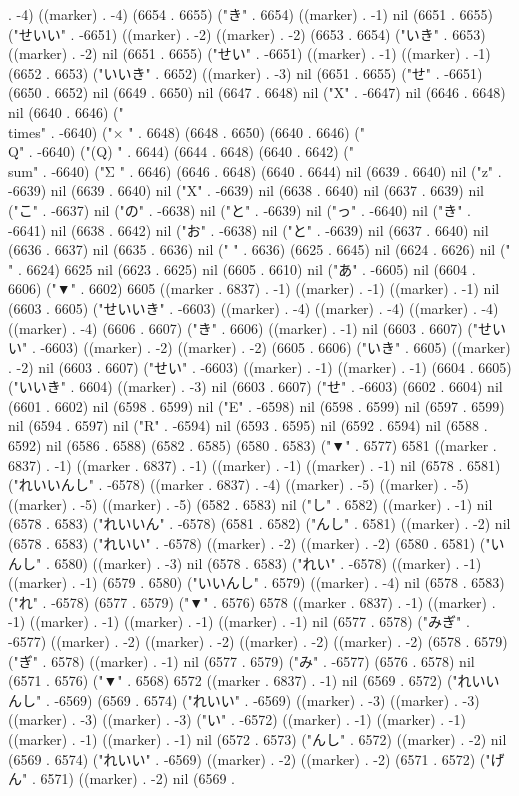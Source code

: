 . -4) ((marker) . -4) (6654 . 6655) ("き" . 6654) ((marker) . -1) nil (6651 . 6655) ("せいい" . -6651) ((marker) . -2) ((marker) . -2) (6653 . 6654) ("いき" . 6653) ((marker) . -2) nil (6651 . 6655) ("せい" . -6651) ((marker) . -1) ((marker) . -1) (6652 . 6653) ("いいき" . 6652) ((marker) . -3) nil (6651 . 6655) ("せ" . -6651) (6650 . 6652) nil (6649 . 6650) nil (6647 . 6648) nil ("X" . -6647) nil (6646 . 6648) nil (6640 . 6646) ("\\times" . -6640) ("×
" . 6648) (6648 . 6650) (6640 . 6646) ("\\Q" . -6640) ("(Q)
" . 6644) (6644 . 6648) (6640 . 6642) ("\\sum" . -6640) ("Σ
" . 6646) (6646 . 6648) (6640 . 6644) nil (6639 . 6640) nil ("z" . -6639) nil (6639 . 6640) nil ("X" . -6639) nil (6638 . 6640) nil (6637 . 6639) nil ("こ" . -6637) nil ("の" . -6638) nil ("と" . -6639) nil ("っ" . -6640) nil ("き" . -6641) nil (6638 . 6642) nil ("お" . -6638) nil ("と" . -6639) nil (6637 . 6640) nil (6636 . 6637) nil (6635 . 6636) nil (" " . 6636) (6625 . 6645) nil (6624 . 6626) nil (" " . 6624) 6625 nil (6623 . 6625) nil (6605 . 6610) nil ("あ" . -6605) nil (6604 . 6606) ("▼" . 6602) 6605 ((marker . 6837) . -1) ((marker) . -1) ((marker) . -1) nil (6603 . 6605) ("せいいき" . -6603) ((marker) . -4) ((marker) . -4) ((marker) . -4) ((marker) . -4) (6606 . 6607) ("き" . 6606) ((marker) . -1) nil (6603 . 6607) ("せいい" . -6603) ((marker) . -2) ((marker) . -2) (6605 . 6606) ("いき" . 6605) ((marker) . -2) nil (6603 . 6607) ("せい" . -6603) ((marker) . -1) ((marker) . -1) (6604 . 6605) ("いいき" . 6604) ((marker) . -3) nil (6603 . 6607) ("せ" . -6603) (6602 . 6604) nil (6601 . 6602) nil (6598 . 6599) nil ("E" . -6598) nil (6598 . 6599) nil (6597 . 6599) nil (6594 . 6597) nil ("R" . -6594) nil (6593 . 6595) nil (6592 . 6594) nil (6588 . 6592) nil (6586 . 6588) (6582 . 6585) (6580 . 6583) ("▼" . 6577) 6581 ((marker . 6837) . -1) ((marker . 6837) . -1) ((marker) . -1) ((marker) . -1) nil (6578 . 6581) ("れいいんし" . -6578) ((marker . 6837) . -4) ((marker) . -5) ((marker) . -5) ((marker) . -5) ((marker) . -5) (6582 . 6583) nil ("し" . 6582) ((marker) . -1) nil (6578 . 6583) ("れいいん" . -6578) (6581 . 6582) ("んし" . 6581) ((marker) . -2) nil (6578 . 6583) ("れいい" . -6578) ((marker) . -2) ((marker) . -2) (6580 . 6581) ("いんし" . 6580) ((marker) . -3) nil (6578 . 6583) ("れい" . -6578) ((marker) . -1) ((marker) . -1) (6579 . 6580) ("いいんし" . 6579) ((marker) . -4) nil (6578 . 6583) ("れ" . -6578) (6577 . 6579) ("▼" . 6576) 6578 ((marker . 6837) . -1) ((marker) . -1) ((marker) . -1) ((marker) . -1) ((marker) . -1) nil (6577 . 6578) ("みぎ" . -6577) ((marker) . -2) ((marker) . -2) ((marker) . -2) ((marker) . -2) (6578 . 6579) ("ぎ" . 6578) ((marker) . -1) nil (6577 . 6579) ("み" . -6577) (6576 . 6578) nil (6571 . 6576) ("▼" . 6568) 6572 ((marker . 6837) . -1) nil (6569 . 6572) ("れいいんし" . -6569) (6569 . 6574) ("れいい" . -6569) ((marker) . -3) ((marker) . -3) ((marker) . -3) ((marker) . -3) ("い" . -6572) ((marker) . -1) ((marker) . -1) ((marker) . -1) ((marker) . -1) nil (6572 . 6573) ("んし" . 6572) ((marker) . -2) nil (6569 . 6574) ("れいい" . -6569) ((marker) . -2) ((marker) . -2) (6571 . 6572) ("げん" . 6571) ((marker) . -2) nil (6569 . 
